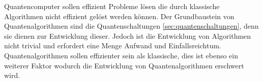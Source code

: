Quantencomputer sollen effizient Probleme l\"osen die durch klassische Algorithmen nicht effizient gel\"ost werden k\"onnen. Der Grundbaustein von Quantenalgorithmen sind die Quantenschaltungen \ref{sec:quantenschaltungen}, denn sie dienen zur Entwicklung dieser. Jedoch ist die Entwicklung von Algorithmen nicht trivial und erfordert eine Menge Aufwand und Einfallsreichtum. Quantenalgorithmen sollen effizienter sein als klassische, dies ist ebenso ein weiterer Faktor wodurch die Entwicklung von Quantenalgorithmen erschwert wird.
